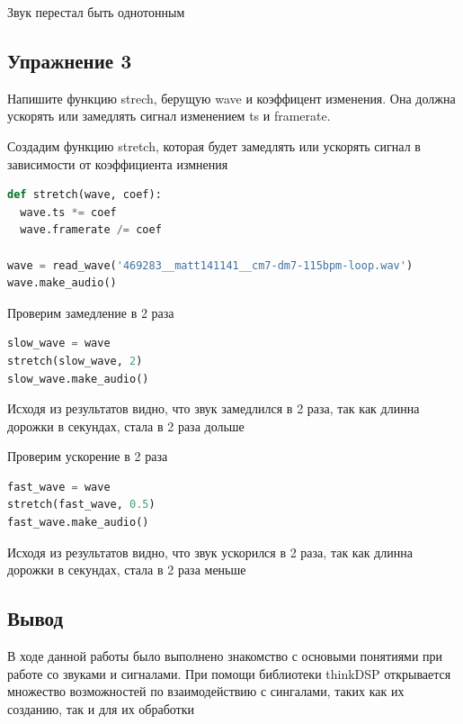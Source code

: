 Звук перестал быть однотонным


\subsection{Упражнение 3}

Напишите функцию strech, берущую wave и коэффицент изменения. Она должна ускорять или замедлять сигнал изменением ts и framerate.

Создадим функцию stretch, которая будет замедлять или ускорять сигнал в зависимости от коэффициента измнения
\begin{lstlisting}[language=Python]
def stretch(wave, coef):
  wave.ts *= coef
  wave.framerate /= coef
  
wave = read_wave('469283__matt141141__cm7-dm7-115bpm-loop.wav')
wave.make_audio()
\end{lstlisting}

Проверим замедление в 2 раза
\begin{lstlisting}[language=Python]
slow_wave = wave
stretch(slow_wave, 2)
slow_wave.make_audio()
\end{lstlisting}

Исходя из результатов видно, что звук замедлился в 2 раза, так как длинна дорожки в секундах, стала в 2 раза дольше

Проверим ускорение в 2 раза
\begin{lstlisting}[language=Python]
fast_wave = wave
stretch(fast_wave, 0.5)
fast_wave.make_audio()
\end{lstlisting}

Исходя из результатов видно, что звук ускорился в 2 раза, так как длинна дорожки в секундах, стала в 2 раза меньше


\subsection{Вывод}
В ходе данной работы было выполнено знакомство с основыми понятиями при работе со звуками и сигналами. При помощи библиотеки thinkDSP открывается множество возможностей по взаимодействию с сингалами, таких как их созданию, так и для их обработки